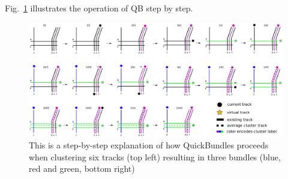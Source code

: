 \documentclass{bioinfo}
\begin{document}
Fig.~\ref{Fig:LSC_simple} illustrates the operation of QB step by step.


\begin{figure}[t]
\centering\includegraphics[scale=0.5,angle=90]{Figures/Fig_1_QB_algorithm}
\caption{This is a step-by-step explanation of how QuickBundles proceeds when clustering six tracks (top left) resulting in three bundles (blue, red and green, bottom right)}
\label{Fig:LSC_simple}
\end{figure}
\end{document}
